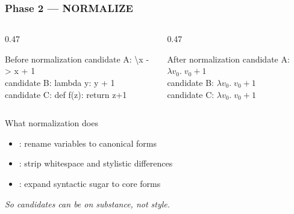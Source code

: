 \begin{frame}
\frametitle{Phase 2 — NORMALIZE}
\begin{columns}[T]
\begin{column}{0.47\textwidth}
\begin{alertblock}{Before normalization}
  \ttfamily\scriptsize
  candidate A: \textbackslash{}x -> x + 1\\
  candidate B: lambda y: y + 1\\
  candidate C: def f(z): return z+1
\end{alertblock}
\end{column}
\begin{column}{0.47\textwidth}
\begin{exampleblock}{After normalization}
  \ttfamily\scriptsize
  candidate A: $\lambda v_0.\; v_0 + 1$\\
  candidate B: $\lambda v_0.\; v_0 + 1$\\
  candidate C: $\lambda v_0.\; v_0 + 1$
\end{exampleblock}
\end{column}
\end{columns}
\vspace{10pt}
\begin{block}{What normalization does}
  \begin{itemize}
    \item {}: rename variables to canonical forms
    \item {}: strip whitespace and stylistic differences
    \item {}: expand syntactic sugar to core forms
  \end{itemize}
\end{block}
\vspace{4pt}
\begin{center}
  {\small\itshape So candidates can be  on substance, not style.}
\end{center}
\end{frame}

